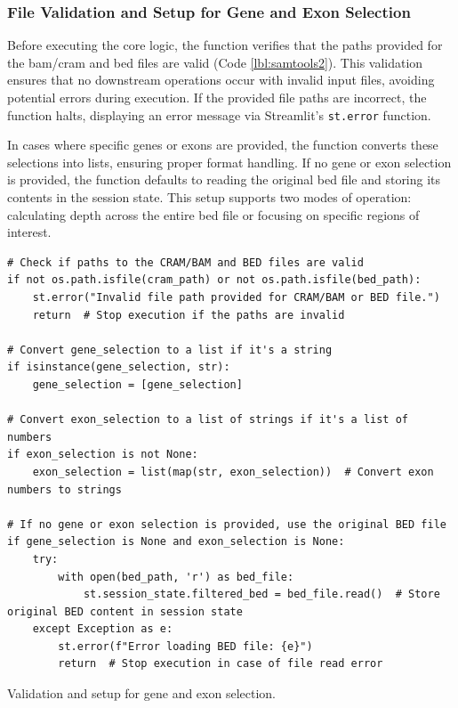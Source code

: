 \subsubsection{\textbf{File Validation and Setup for Gene and Exon Selection}}

Before executing the core logic, the function verifies that the paths provided for the \ac{bam}/\ac{cram} and \ac{bed} files are valid (Code \ref{lbl:samtools2}). This validation ensures that no downstream operations occur with invalid input files, avoiding potential errors during execution. If the provided file paths are incorrect, the function halts, displaying an error message via Streamlit's \texttt{st.error} function.

In cases where specific genes or exons are provided, the function converts these selections into lists, ensuring proper format handling. If no gene or exon selection is provided, the function defaults to reading the original \ac{bed} file and storing its contents in the session state. This setup supports two modes of operation: calculating depth across the entire \ac{bed} file or focusing on specific regions of interest.

\begin{longlisting}
\begin{verbatim}
# Check if paths to the CRAM/BAM and BED files are valid
if not os.path.isfile(cram_path) or not os.path.isfile(bed_path):
    st.error("Invalid file path provided for CRAM/BAM or BED file.")
    return  # Stop execution if the paths are invalid

# Convert gene_selection to a list if it's a string
if isinstance(gene_selection, str):
    gene_selection = [gene_selection]

# Convert exon_selection to a list of strings if it's a list of numbers
if exon_selection is not None:
    exon_selection = list(map(str, exon_selection))  # Convert exon numbers to strings

# If no gene or exon selection is provided, use the original BED file
if gene_selection is None and exon_selection is None:
    try:
        with open(bed_path, 'r') as bed_file:
            st.session_state.filtered_bed = bed_file.read()  # Store original BED content in session state
    except Exception as e:
        st.error(f"Error loading BED file: {e}")
        return  # Stop execution in case of file read error
\end{verbatim}
\caption{Validation and setup for gene and exon selection.}
\label{lbl:samtools2}
\end{longlisting}

